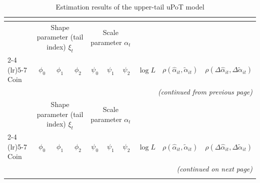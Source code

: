 \documentclass{article}
\begin{document}
\begin{landscape}
\begin{longtable}{lccccccccc}
\caption{Estimation results of the upper-tail uPoT model}\\
\label{tab:uptail_uPot} \\
\toprule
& \multicolumn{3}{c}{Shape parameter (tail index) $\xi_t$}
& \multicolumn{3}{c}{Scale parameter $\alpha_t$}
& & & \\
\cmidrule(lr){2-4} \cmidrule(lr){5-7}
Coin
& $\phi_0$ & $\phi_1$ & $\phi_2$
& $\psi_0$ & $\psi_1$ & $\psi_2$
& $\log L$
& $\rho(\hat{\alpha}_{it},\tilde{\alpha}_{it})$
& $\rho(\Delta\hat{\alpha}_{it},\Delta\tilde{\alpha}_{it})$ \\
\midrule
\endfirsthead

\multicolumn{10}{r}{\textit{(continued from previous page)}}\\
\toprule
& \multicolumn{3}{c}{Shape parameter (tail index) $\xi_t$}
& \multicolumn{3}{c}{Scale parameter $\alpha_t$}
& & & \\
\cmidrule(lr){2-4} \cmidrule(lr){5-7}
Coin
& $\phi_0$ & $\phi_1$ & $\phi_2$
& $\psi_0$ & $\psi_1$ & $\psi_2$
& $\log L$
& $\rho(\hat{\alpha}_{it},\tilde{\alpha}_{it})$
& $\rho(\Delta\hat{\alpha}_{it},\Delta\tilde{\alpha}_{it})$ \\
\midrule
\endhead

\midrule
\multicolumn{10}{r}{\textit{(continued on next page)}}\\
\endfoot


\end{longtable}
\end{landscape}
\end{document}
